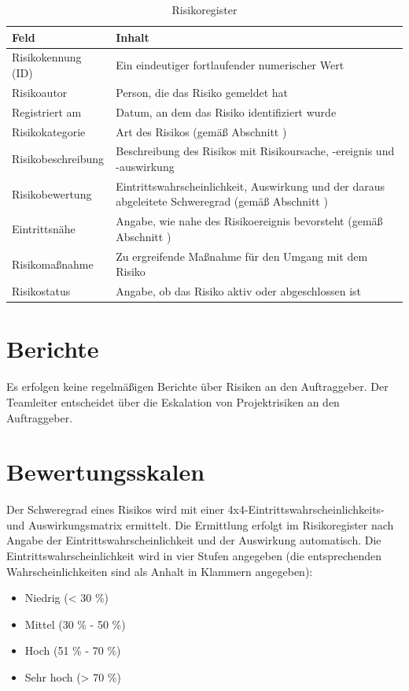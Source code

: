 \documentclass[a4paper,11pt,listof=numbered,glossary=totoc,parskip=half]{scrreprt}
\begin{document}
\begin{table}
\begin{tabularx}{\textwidth}{lX}
	\toprule
	Feld & Inhalt \\
	\midrule
	Risikokennung (ID) & Ein eindeutiger fortlaufender numerischer Wert \\
	 Risikoautor& Person, die das Risiko gemeldet hat \\
	 Registriert am& Datum, an dem das Risiko identifiziert wurde\\
	 Risikokategorie& Art des Risikos (gemäß Abschnitt \nameref{subsec:risikokategorien})\\
	 Risikobeschreibung& Beschreibung des Risikos mit Risikoursache, -ereignis und -auswirkung\\
	 Risikobewertung& Eintrittswahrscheinlichkeit, Auswirkung und der daraus abgeleitete Schweregrad (gemäß Abschnitt \nameref{subsec:bewertungsskalen})\\
	 Eintrittsnähe& Angabe, wie nahe des Risikoereignis bevorsteht (gemäß Abschnitt \nameref{subsec:eintrittsnaehe})\\
	 Risikomaßnahme& Zu ergreifende Maßnahme für den Umgang mit dem Risiko\\
	 Risikostatus& Angabe, ob das Risiko aktiv oder abgeschlossen ist\\
	 \bottomrule
	 
\end{tabularx}
\caption{Risikoregister}
\label{tab:risikoregister}
\end{table}
	
\section{Berichte}

Es erfolgen keine regelmäßigen Berichte über Risiken an den Auftraggeber. Der Teamleiter entscheidet über die Eskalation von Projektrisiken an den Auftraggeber.

\section{Bewertungsskalen}
\label{subsec:bewertungsskalen}

Der Schweregrad eines Risikos wird mit einer 4x4-Eintrittswahrscheinlichkeits- und Auswirkungsmatrix ermittelt. Die Ermittlung erfolgt im Risikoregister nach Angabe der Eintrittswahrscheinlichkeit und der Auswirkung automatisch.
Die Eintrittswahrscheinlichkeit wird in vier Stufen angegeben (die entsprechenden Wahrscheinlichkeiten sind als Anhalt in Klammern angegeben):
\begin{itemize}
	\item Niedrig (< 30 \%)
	\item Mittel (30 \% - 50 \%)
	\item Hoch (51 \% - 70 \%)
	\item Sehr hoch (> 70 \%)
\end{itemize}
\end{document}
